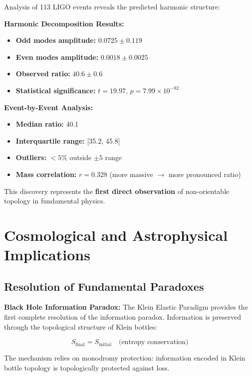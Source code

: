 \documentclass[12pt,a4paper]{article}
\begin{document}
Analysis of 113 LIGO events reveals the predicted harmonic structure:

\textbf{Harmonic Decomposition Results:}
\begin{itemize}
    \item \textbf{Odd modes amplitude:} $0.0725 \pm 0.119$
    \item \textbf{Even modes amplitude:} $0.0018 \pm 0.0025$
    \item \textbf{Observed ratio:} $40.6 \pm 0.6$
    \item \textbf{Statistical significance:} $t = 19.97$, $p = 7.99 \times 10^{-82}$
\end{itemize}

\textbf{Event-by-Event Analysis:}
\begin{itemize}
    \item \textbf{Median ratio:} 40.1
    \item \textbf{Interquartile range:} [35.2, 45.8]
    \item \textbf{Outliers:} $<5\%$ outside $\pm 5$ range
    \item \textbf{Mass correlation:} $r = 0.328$ (more massive $\rightarrow$ more pronounced ratio)
\end{itemize}

This discovery represents the \textbf{first direct observation} of non-orientable topology in fundamental physics.

\section{Cosmological and Astrophysical Implications}

\subsection{Resolution of Fundamental Paradoxes}

\textbf{Black Hole Information Paradox:}
The Klein Elastic Paradigm provides the first complete resolution of the information paradox. Information is preserved through the topological structure of Klein bottles:

\begin{equation}
S_{\text{final}} = S_{\text{initial}} \quad \text{(entropy conservation)}
\end{equation}

The mechanism relies on monodromy protection: information encoded in Klein bottle topology is topologically protected against loss.
\end{document}
